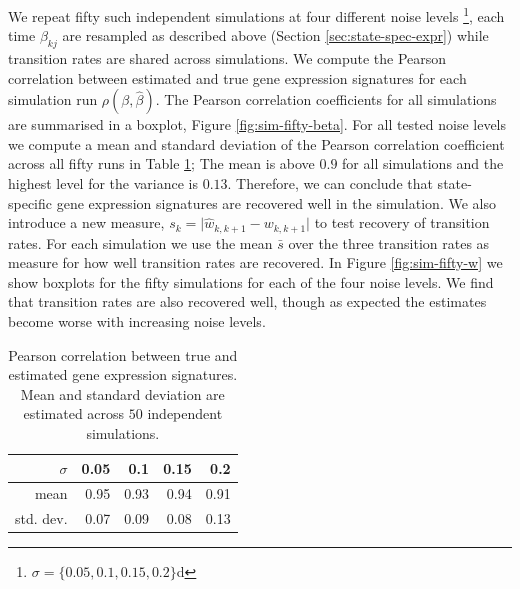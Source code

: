 We repeat fifty such independent simulations at four different noise levels \footnote{$\sigma=\lbrace 0.05, 0.1, 0.15, 0.2 \rbrace$d}, each time $\beta_{kj}$ are resampled as described above (Section \ref{sec:state-spec-expr}) while transition rates are shared across simulations. We compute the Pearson correlation between estimated and true gene expression signatures for each simulation run $\rho(\beta,\hat{\beta})$. The Pearson correlation coefficients for all simulations are summarised in a boxplot, Figure \ref{fig:sim-fifty-beta}. For all tested noise levels we compute a mean and standard deviation of the Pearson correlation coefficient across all fifty runs in Table \ref{tab:cor-beta-fifty}; The mean is above $0.9$ for all simulations and the highest level for the variance is $0.13$. Therefore, we can conclude that state-specific gene expression signatures are recovered well in the simulation. We also introduce a new measure, $s_k = \lvert \hat{w}_{k,k+1} - w_{k,k+1} \rvert$ to test recovery of transition rates. For each simulation we use the mean $\bar{s}$ over the three transition rates as measure for how well transition rates are recovered. In Figure \ref{fig:sim-fifty-w} we show boxplots for the fifty simulations for each of the four noise levels. We find that transition rates are also recovered well, though as expected the estimates become worse with increasing noise levels.

\begin{table}[ht]
\centering
\begin{tabular}{rrrrr}
  \hline
$\sigma$ & 0.05 & 0.1 & 0.15 & 0.2 \\
  \hline
mean & 0.95 & 0.93 & 0.94 & 0.91 \\
std. dev. & 0.07 & 0.09 & 0.08 & 0.13 \\
   \hline
 \end{tabular}
 \caption{Pearson correlation between true and estimated gene expression signatures. Mean and standard deviation are estimated across $50$ independent simulations.}
 \label{tab:cor-beta-fifty}
\end{table}


